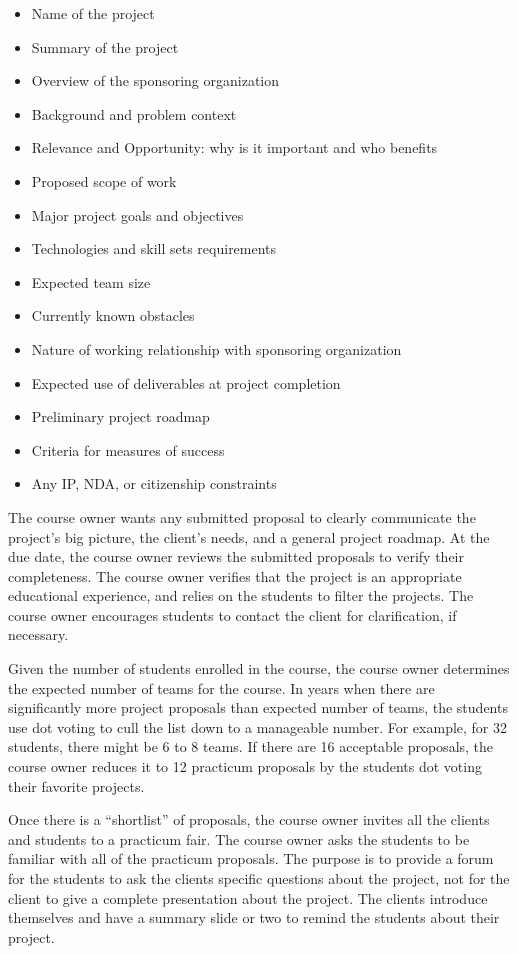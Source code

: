 \begin{itemize}
\itemsep1pt\parskip0pt
\item
  {Name of the project}
\item
  {Summary of the project}
\item
  {Overview of the sponsoring organization}
\item
  {Background and problem context }
\item
  {Relevance and Opportunity: why is it important and who benefits}
\item
  {Proposed scope of work}
\item
  {Major project goals and objectives }
\item
  {Technologies and skill sets requirements }
\item
  {Expected team size }
\item
  {Currently known obstacles}
\item
  {Nature of working relationship with sponsoring organization}
\item
  {Expected use of deliverables at project completion}
\item
  {Preliminary project roadmap}
\item
  {Criteria for measures of success}
\item
  {Any IP, NDA, or citizenship constraints}
\end{itemize}

The course owner wants any submitted proposal to clearly communicate
the project's big picture, the client's needs, and a general project
roadmap. At the due date, the course owner reviews the submitted
proposals to verify their completeness. The course owner verifies that
the project is an appropriate educational experience, and relies on the
students to filter the projects. The course owner encourages
students to contact the client for clarification, if necessary.

Given the number of students enrolled in the course, the course owner
determines the expected number of teams for the course. In years when
there are significantly more project proposals than expected number of
teams, the students use dot voting to cull the list down to a manageable
number. For example, for 32 students, there might be 6 to 8 teams. If
there are 16 acceptable proposals, the course owner reduces it to 12
practicum proposals by the students dot voting their favorite projects.

Once there is a ``shortlist'' of proposals, the course owner invites
all the clients and students to a practicum fair. The course owner asks
the students to be familiar with all of the practicum proposals. The
purpose is to provide a forum for the students to ask the clients
specific questions about the project, not for the client to give a
complete presentation about the project. The clients introduce themselves
and have a summary slide or two to remind the students about their
project. 

